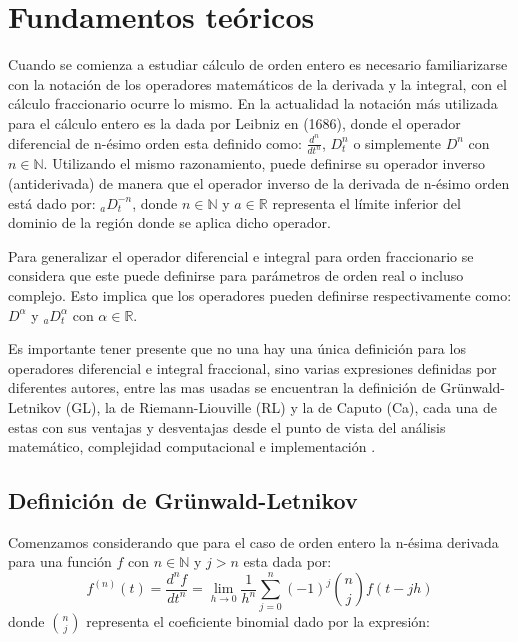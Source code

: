 \chapter{Fundamentos teóricos}		

	Cuando se comienza a estudiar cálculo de orden entero es necesario familiarizarse con la notación de los operadores matemáticos de la derivada y la integral, con el cálculo fraccionario ocurre lo mismo. En la actualidad la notación más utilizada para el cálculo entero es la dada por Leibniz en (1686), donde el operador diferencial de n-ésimo orden esta definido como: $\frac{d^{n}}{dt^{n}}$, $D_{t}^{n}$ o simplemente $D^{n}$ con $n \in \mathbb{N}$. Utilizando el mismo razonamiento, puede definirse su operador inverso (antiderivada) de manera que el operador inverso de la derivada de n-ésimo orden está dado por: $_{a}D^{-n}_{t}$, donde $n \in \mathbb{N}$ y $a \in \mathbb{R}$ representa el límite inferior del dominio de la región donde se aplica dicho operador.
			
	Para generalizar el operador diferencial e integral para orden fraccionario se considera que este puede definirse para parámetros de orden real o incluso complejo. Esto implica que los operadores pueden definirse respectivamente como: $D^{\alpha}$ y $_{a}D^{\alpha}_{t}$ con $ \alpha \in \mathbb{R}$. 
		
	Es importante tener presente que no una hay una única definición para los operadores diferencial e integral fraccional, sino varias expresiones definidas por diferentes autores, entre las mas usadas se encuentran la definición de Grünwald-Letnikov (GL), la de Riemann-Liouville (RL) y la de Caputo (Ca), cada una de estas con sus ventajas y desventajas desde el punto de vista del análisis matemático, complejidad computacional e implementación \cite{Petras2011}.
			
	\section{Definición de Grünwald-Letnikov}

	Comenzamos considerando que para el caso de orden entero la n-ésima derivada para una función $f$ con $n \in \mathbb{N}$ y $j>n$ esta dada por:
	\begin{equation}
		f^{(n)}(t) = \frac{d^{n}f}{dt^{n}} = \lim_{h \to 0 } \frac{1}{h^{n}} \sum_{j = 0}^{n} (-1)^{j} \binom{n}{j} f(t - jh)
		\label{ec:derivada_entera}
	\end{equation}
	donde $\binom{n}{j}$ representa el coeficiente binomial dado por la expresión:
			
